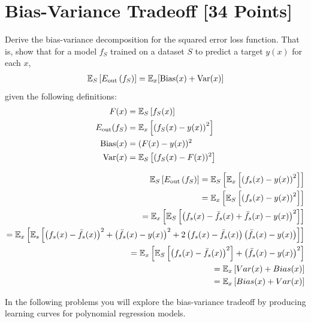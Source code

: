
\newpage
\section{Bias-Variance Tradeoff [34 Points]}

\begin{problem}[5]
  Derive the bias-variance decomposition for the squared error loss function. That is, show that for a model $f_S$ trained on a dataset $S$ to predict a target $y(x)$ for each $x$,
  \begin{align*}
    \mathbb{E}_S \left[E_\text{out}\left(f_S\right)\right] = \mathbb{E}_x[\operatorname{Bias}(x) + \operatorname{Var}(x)]
  \end{align*}
  given the following definitions:
  \begin{align*}
    F(x) &= \mathbb{E}_S\left[f_S(x) \right] \\
    E_\text{out}(f_S) &= \mathbb{E}_x\left[\left(f_S(x) - y(x)\right)^2\right] \\
    \operatorname{Bias}(x) &= (F(x) - y(x))^2 \\
    \operatorname{Var}(x) &= \mathbb{E}_S\left[(f_S(x)-F(x))^2\right]
  \end{align*}
\end{problem}

\begin{solution}
\begin{align}
    \mathbb{E}_S \left[E_\text{out}\left(f_S\right)\right] = \mathbb{E}_S\left[\mathbb{E}_x\left[\left(f_s(x) - y(x)\right)^2 \right]\right]\\
    = \mathbb{E}_x\left[\mathbb{E}_S\left[\left(f_s(x) - y(x)\right)^2 \right]\right]\\
    = \mathbb{E}_x\left[\mathbb{E}_S\left[ \left(f_s(x) - \Bar{f_s}(x) + \Bar{f_s}(x) - y(x)\right)^2\right]\right]\\
    = \mathbb{E}_x\left[\mathbb{E}_s\left[\left(f_s(x) - \Bar{f_s}(x)\right)^2 + \left(\Bar{f_s}(x) - y(x)\right)^2 + 2\left(f_s(x)-\Bar{f_s}(x)\right) \left(\Bar{f_s}(x) - y(x)\right)\right]\right]\\
    = \mathbb{E}_x\left[\mathbb{E}_S\left[\left(f_s(x) - \Bar{f_s}(x)\right)^2\right] +\left(\Bar{f_s}(x) - y(x)\right)^2\right]\\
    = \mathbb{E}_x\left[Var(x) + Bias(x)\right]\\
    = \mathbb{E}_x\left[Bias(x) + Var(x)\right]\\
\end{align}
\end{solution}

In the following problems you will explore the bias-variance tradeoff by producing learning curves for polynomial regression models.

